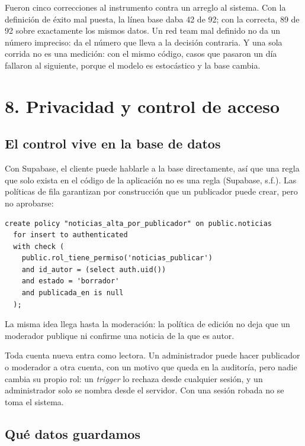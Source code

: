 \documentclass[12pt,a4paper]{article}
\begin{document}
Fueron cinco correcciones al instrumento contra un arreglo al sistema. Con la definición de éxito mal
puesta, la línea base daba 42 de 92; con la correcta, 89 de 92 sobre exactamente los mismos datos.
Un red team mal definido no da un número impreciso: da el número que lleva a la decisión contraria.
Y una sola corrida no es una medición: con el mismo código, casos que pasaron un día fallaron al
siguiente, porque el modelo es estocástico y la base cambia.

\section{8. Privacidad y control de acceso}

\subsection{El control vive en la base de datos}

Con Supabase, el cliente puede hablarle a la base directamente, así que una regla que solo exista
en el código de la aplicación no es una regla (Supabase, s.f.). Las políticas de fila garantizan
por construcción que un publicador puede crear, pero no aprobarse:

\begin{verbatim}
create policy "noticias_alta_por_publicador" on public.noticias
  for insert to authenticated
  with check (
    public.rol_tiene_permiso('noticias_publicar')
    and id_autor = (select auth.uid())
    and estado = 'borrador'
    and publicada_en is null
  );
\end{verbatim}

La misma idea llega hasta la moderación: la política de edición no deja que un moderador publique
ni confirme una noticia de la que es autor.

Toda cuenta nueva entra como lectora. Un administrador puede hacer publicador o moderador a otra
cuenta, con un motivo que queda en la auditoría, pero nadie cambia su propio rol: un
\emph{trigger} lo rechaza desde cualquier sesión, y un administrador solo se nombra desde el
servidor. Con una sesión robada no se toma el sistema.

\subsection{Qué datos guardamos}
\end{document}
